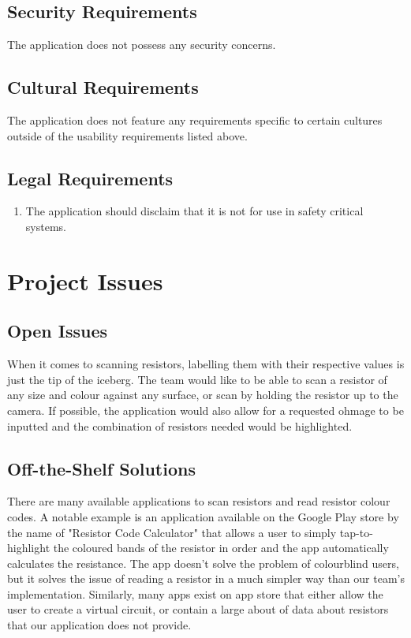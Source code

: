 \documentclass{article}
\begin{document}
\subsection{Security Requirements}
The application does not possess any security concerns.
\subsection{Cultural Requirements}
The application does not feature any requirements specific to certain cultures outside of the usability requirements listed above.
\subsection{Legal Requirements}
\begin{enumerate}
\item The application should disclaim that it is not for use in safety critical systems.
\end{enumerate}

\section{Project Issues}

\subsection{Open Issues }
When it comes to scanning resistors, labelling them with their respective values is just the tip of the iceberg. The team would like to be able to scan a resistor of any size and colour against any surface, or scan by holding the resistor up to the camera. If possible, the application would also allow for a requested ohmage to be inputted and the combination of resistors needed would be highlighted.

\subsection{Off-the-Shelf Solutions}
There are many available applications to scan resistors and read resistor colour codes. A notable example is an application available on the Google Play store by the name of "Resistor Code Calculator" that allows a user to simply tap-to-highlight the coloured bands of the resistor in order and the app automatically calculates the resistance. The app doesn't solve the problem of colourblind users, but it solves the issue of reading a resistor in a much simpler way than our team's implementation. Similarly, many apps exist on app store that either allow the user to create a virtual circuit, or contain a large about of data about resistors that our application does not provide.
\end{document}
